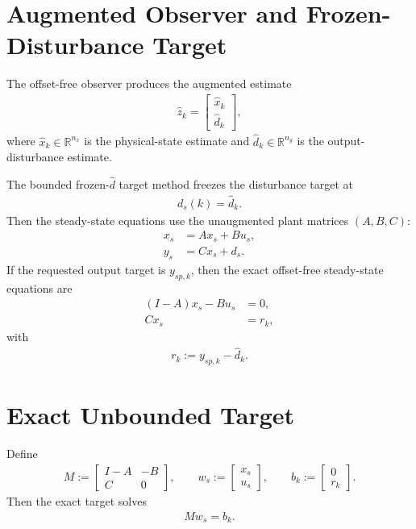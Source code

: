 \documentclass[11pt]{article}
\begin{document}
\section{Augmented Observer and Frozen-Disturbance Target}

The offset-free observer produces the augmented estimate
\begin{align}
\hat z_k =
\begin{bmatrix}
\hat x_k \\
\hat d_k
\end{bmatrix},
\end{align}
where $\hat x_k \in \mathbb{R}^{n_x}$ is the physical-state estimate and $\hat d_k \in \mathbb{R}^{n_y}$ is the output-disturbance estimate.

The bounded frozen-$\hat d$ target method freezes the disturbance target at
\begin{align}
d_s(k) = \hat d_k.
\end{align}
Then the steady-state equations use the unaugmented plant matrices $(A,B,C)$:
\begin{align}
x_s &= A x_s + B u_s, \\
y_s &= C x_s + d_s.
\end{align}
If the requested output target is $y_{sp,k}$, then the exact offset-free steady-state equations are
\begin{align}
(I-A)x_s - Bu_s &= 0, \\
Cx_s &= r_k,
\end{align}
with
\begin{align}
r_k := y_{sp,k} - \hat d_k.
\end{align}

\section{Exact Unbounded Target}

Define
\begin{align}
M :=
\begin{bmatrix}
I-A & -B \\
C & 0
\end{bmatrix},
\qquad
w_s :=
\begin{bmatrix}
x_s \\
u_s
\end{bmatrix},
\qquad
b_k :=
\begin{bmatrix}
0 \\
r_k
\end{bmatrix}.
\end{align}
Then the exact target solves
\begin{align}
Mw_s = b_k.
\end{align}
\end{document}
